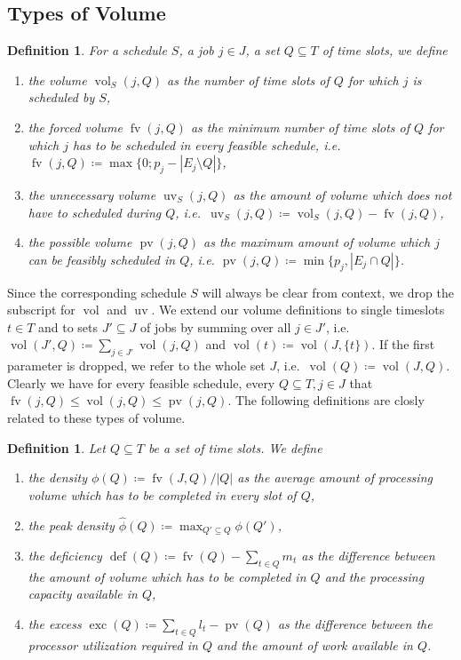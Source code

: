 \documentclass[a4paper]{article}
\DeclareMathOperator{\fv}{fv}
\DeclareMathOperator{\uv}{uv}
\DeclareMathOperator{\pv}{pv}
\DeclareMathOperator{\vol}{vol}
\DeclareMathOperator{\opdef}{def}
\DeclareMathOperator{\exc}{exc}
\newtheorem{definition}[theorem]{Definition}
\begin{document}
\subsection{Types of Volume}
\begin{definition}
  For a schedule $S$, a job $j \in J$, a set $Q \subseteq T$ of time slots, we define
  \begin{enumerate}
    \item
      the \emph{volume} $\vol_S(j, Q)$ as the number of time slots of $Q$ for which $j$ is scheduled by $S$,
    \item
      the \emph{forced volume} $\fv(j, Q)$ as the minimum number of time slots of $Q$ for which $j$ has to be scheduled in every feasible schedule, i.e.\ $\fv(j, Q) \coloneqq \max\{0; p_j - |E_j \setminus Q|\}$,
    \item
      the \emph{unnecessary volume} $\uv_S(j, Q)$ as the amount of volume which does not have to scheduled during $Q$, i.e.\ $\uv_S(j, Q) \coloneqq \vol_S(j, Q) - \fv(j,Q)$,
    \item
      the \emph{possible volume} $\pv(j, Q)$ as the maximum amount of volume which $j$ can be feasibly scheduled in $Q$, i.e.
    $\pv(j, Q) \coloneqq \min\{ p_j, | E_j \cap Q | \}$.
  \end{enumerate}
\end{definition}
Since the corresponding schedule $S$ will always be clear from context, we drop the subscript for $\vol$ and $\uv$.
We extend our volume definitions to single timeslots $t\in T$ and to sets $J' \subseteq J$ of jobs by summing over all $j \in J'$, i.e.
$\vol(J', Q) \coloneqq \sum_{j \in J'} \vol(j, Q)$ and
$\vol(t) \coloneqq \vol(J, \{t\})$.
If the first parameter is dropped, we refer to the whole set $J$, i.e.\ $\vol(Q) \coloneqq \vol(J, Q)$.
Clearly we have for every feasible schedule, every $Q \subseteq T, j \in J$ that $\fv(j, Q) \leq \vol(j, Q) \leq \pv(j, Q)$.
The following definitions are closly related to these types of volume.
\begin{definition}
  Let $Q \subseteq T$ be a set of time slots.
  We define
  \begin{enumerate}
    \item
      the \emph{density} $\phi(Q) \coloneqq \fv(J, Q) / |Q|$ as the average amount of processing volume which has to be completed in every slot of $Q$,
    \item
      the \emph{peak density} $\hat \phi(Q) \coloneqq \max_{Q' \subseteq Q} \phi(Q')$,
    \item
      the \emph{deficiency} $\opdef(Q) \coloneqq \fv(Q) - \sum_{t \in Q} m_t$ as the difference between the amount of volume which has to be completed in $Q$ and the processing capacity available in $Q$,
    \item
      the \emph{excess} $\exc(Q) \coloneqq \sum_{t \in Q} l_t - \pv(Q)$ as the difference between the processor utilization required in $Q$ and the amount of work available in $Q$.
  \end{enumerate}
\end{definition}
\end{document}

